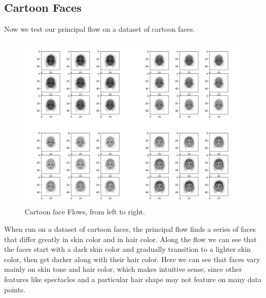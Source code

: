 \documentclass[12pt]{report}
\begin{document}
\begin{appendices}
\section{Cartoon Faces}
Now we test our principal flow on a dataset of cartoon faces.
\begin{figure}[ht]
    \begin{center}
        \includegraphics[scale=0.25]{main_cartoon_10_01.png}
        \caption{Cartoon face Flows, from left to right.}
        \label{fig:cartoonfaceflows1}
    \end{center}
\end{figure}

When run on a dataset of cartoon faces, the principal flow finds a series of 
faces that differ greatly in skin color and in hair color. Along the flow 
we can see that the faces start with a dark skin color and gradually 
transition to a lighter skin color, then get darker along with their hair color. 
Here we can see that faces vary mainly on skin tone and hair color, which makes intuitive sense, 
since other features like spectacles and a particular hair shape may not feature on many
data points.

\newpage

\end{appendices}
\end{document}
